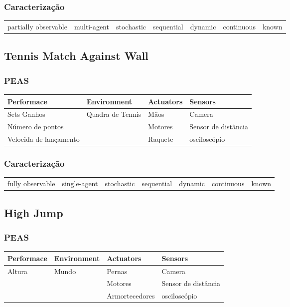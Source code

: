 \documentclass[a4paper,12pt]{article}
\begin{document}
\subsubsection{Caracterização}
\begin{table}[h!]
\begin{tabular}{|c|c|c|c|c|c|c|}
\hline
partially observable & multi-agent & stochastic & sequential & dynamic & continuous & known
\end{tabular}
\end{table}

\subsection{Tennis Match Against Wall}
\subsubsection{PEAS}
\begin{table}[h!]
\begin{tabular}{l|l|l|l}
\hline
Performace & Environment & Actuators & Sensors \\
\hline
Sets Ganhos & Quadra de Tennis & Mãos & Camera \\
Número de pontos & & Motores & Sensor de distância\\
Velocida de lançamento & & Raquete & osciloscópio\\
\end{tabular}
\end{table}
\subsubsection{Caracterização}
\begin{table}[h!]
\begin{tabular}{|c|c|c|c|c|c|c|}
\hline
fully observable & single-agent & stochastic & sequential & dynamic & continuous & known
\end{tabular}
\end{table}

\subsection{High Jump}
\subsubsection{PEAS}
\begin{table}[h!]
\begin{tabular}{l|l|l|l}
\hline
Performace & Environment & Actuators & Sensors \\
\hline
Altura & Mundo & Pernas & Camera \\
 & & Motores & Sensor de distância\\
 & & Armortecedores & osciloscópio\\
\end{tabular}
\end{table}
\end{document}
